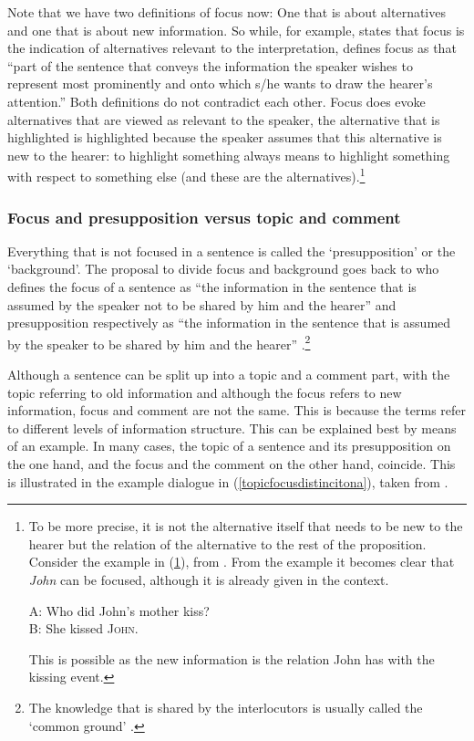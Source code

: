 Note that we have two definitions of focus now: One that is about alternatives and one that is about new information. So while, for example, \citet[18]{krifka2007basic} states that focus is the indication of alternatives relevant to the interpretation, \citet[1876]{hinterwimmer2011formation} defines focus as that ``part of the sentence that conveys the information the speaker wishes to represent most prominently and onto which s/he wants to draw the hearer's attention.'' Both definitions do not contradict each other. Focus does evoke alternatives that are viewed as relevant to the speaker, the alternative that is highlighted is highlighted because the speaker assumes that this alternative is new to the hearer: to highlight something always means to highlight something with respect to something else (and these are the alternatives).\footnote{To be more precise, it is not the alternative itself that needs to be new to the hearer but the relation of the alternative to the rest of the proposition. Consider the example in (\ref{kissmotherrelation}), from \citet[55]{rochemont2016givenness}. From the example it becomes clear that \textit{John} can be focused, although it is already given in the context.

\ea A: Who did John's mother kiss? \\
B: She kissed \textsc{John}. \label{kissmotherrelation}
\z

\noindent This is possible as the new information is the relation John has with the kissing event.

}


\subsubsection{Focus and presupposition versus topic and comment}
Everything that is not focused in a sentence is called the `presupposition' or the `background'. The proposal to divide focus and background goes back to \citet{jackendoff1972semantic} who defines the focus of a sentence as ``the information in the sentence that is assumed by the speaker not to be shared by him and the hearer'' and presupposition respectively as ``the information in the sentence that is assumed by the speaker to be shared by him and the hearer'' \citep[230]{jackendoff1972semantic}.\footnote{The knowledge that is shared by the interlocutors is usually called the `common ground' \citep{stalnaker1978assertion}.}

Although a sentence can be split up into a topic and a comment part, with the topic referring to old information and although the focus refers to new information, focus and comment are not the same. This is because the terms refer to different levels of information structure. This can be explained best by means of an example. In many cases, the topic of a sentence and its presupposition on the one hand, and the focus and the comment on the other hand, coincide. This is illustrated in the example dialogue in (\ref{topicfocusdistincitona}), taken from \citet[467]{vallduvi1996linguistic}.

